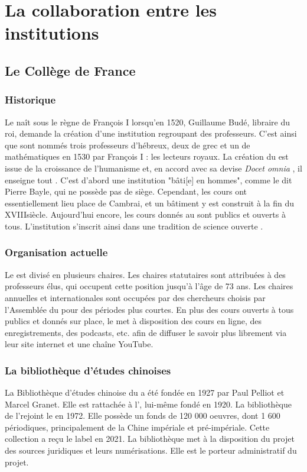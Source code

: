 \section{La collaboration entre les institutions}
\subsection{Le Collège de France}

\subsubsection{Historique}
Le \cdf naît sous le règne de François I\ier{} lorsqu'en 1520, Guillaume Budé, libraire du roi, demande la création d'une institution regroupant des professeurs. C'est ainsi que sont nommés trois professeurs d'hébreux, deux de grec et un de mathématiques en 1530 par François I\ier{} : les lecteurs royaux. La création du \cdf est issue de la croissance de l'humanisme et, en accord avec sa devise \textit{\og Docet omnia \fg}, il enseigne \og tout \fg. C'est d'abord une institution "bâti[e] en hommes", comme le dit Pierre Bayle, qui ne possède pas de siège. Cependant, les cours ont essentiellement lieu place de Cambrai, et un bâtiment y est construit à la fin du XVIII\ieme siècle. Aujourd'hui encore, les cours donnés au \cdf sont publics et ouverts à tous. L'institution s'inscrit ainsi dans une tradition de \og science ouverte \fg. 

\subsubsection{Organisation actuelle}
Le \cdf est divisé en plusieurs chaires. Les chaires statutaires sont attribuées à des professeurs élus, qui occupent cette position jusqu'à l'âge de 73 ans. Les chaires annuelles et internationales sont occupées par des chercheurs choisis par l'Assemblée du \cdf pour des périodes plus courtes. En plus des cours ouverts à tous publics et donnés sur place, le \cdf met à disposition des cours en ligne, des enregistrements, des podcasts, etc. afin de diffuser le savoir plus librement via leur site internet et une chaîne YouTube. 

\subsubsection{La bibliothèque d'études chinoises}
La Bibliothèque d'études chinoise du \cdf a été fondée en 1927 par Paul Pelliot et Marcel Granet. Elle est rattachée à l'\IHEC, lui-même fondé en 1920. La bibliothèque de l'\IHEC rejoint le \cdf en 1972. Elle possède un fonds de 120 000 oeuvres, dont 1 600 périodiques, principalement de la Chine impériale et pré-impériale. Cette collection a reçu le label \CollEx en 2021. La bibliothèque met à la disposition du projet \COREL des sources juridiques et leurs numérisations. Elle est le porteur administratif du projet.

